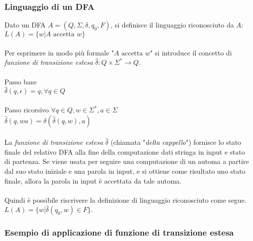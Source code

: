 \documentclass[]{article}
\begin{document}
\subsubsection{Linguaggio di un DFA}

Dato un DFA \mbox{$A = (Q, \Sigma, \delta, q_0, F)$}, si definisce il linguaggio riconosciuto da \mbox{$A$}:
\\

\mbox{$L(A) = \{ w | A \text{ accetta } w \}$}
\\
\\
Per esprimere in modo più formale "\mbox{$A \text{ accetta } w$}" si introduce il concetto di
\textit{funzione di transizione estesa} \mbox{$\hat\delta \colon Q \times \Sigma^* \to Q$}.
\\
\\
Passo base
\\
\mbox{$\hat\delta(q, \epsilon) = q, \forall q \in Q$}
\\
\\
Passo ricorsivo \mbox{$\forall q \in Q, w \in \Sigma^*, a \in \Sigma$}
\\
\mbox{$\hat\delta(q, wa) = \delta(\hat\delta(q, w), a)$}
\\
\\
La \textit{funzione di transizione estesa} \mbox{$\hat\delta$} (chiamata "\textit{delta cappello}") fornisce
lo stato finale del relativo DFA alla fine della computazione dati stringa in input e stato di partenza.
Se viene usata per seguire una computazione di un automa a partire dal suo stato iniziale e una parola in
input, e si ottiene come risultato uno stato finale, allora la parola in input è accettata da tale automa.
\\
\\
Quindi è possibile riscrivere la definizione di linguaggio riconosciuto come segue.
\\
\mbox{$L(A) = \{ w | \hat\delta(q_0, w) \in F \}$}.



\subsubsection{Esempio di applicazione di funzione di transizione estesa}
\end{document}
